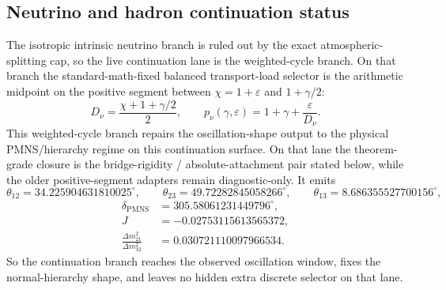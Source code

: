 \documentclass[11pt]{article}
\begin{document}
\subsection{Neutrino and hadron continuation status}

The isotropic intrinsic neutrino branch is ruled out by the exact atmospheric-splitting cap, so the live continuation lane is the weighted-cycle branch. On that branch the standard-math-fixed balanced transport-load selector is the arithmetic midpoint on the positive segment between \(\chi=1+\varepsilon\) and \(1+\gamma/2\):
\[
D_\nu=\frac{\chi+1+\gamma/2}{2},
\qquad
p_\nu(\gamma,\varepsilon)=1+\gamma+\frac{\varepsilon}{D_\nu}.
\]
This weighted-cycle branch repairs the oscillation-shape output to the physical PMNS/hierarchy regime on this continuation surface. On that lane the theorem-grade closure is the bridge-rigidity / absolute-attachment pair stated below, while the older positive-segment adapters remain diagnostic-only. It emits
\[
\theta_{12}=34.225904631810025^\circ,\qquad
\theta_{23}=49.72282845058266^\circ,\qquad
\theta_{13}=8.686355527700156^\circ,
\]
\[
\begin{aligned}
\delta_{\mathrm{PMNS}}&=305.58061231449796^\circ,\\
J&=-0.02753115613565372,\\
\frac{\Delta m_{21}^2}{\Delta m_{32}^2}&=0.030721110097966534.
\end{aligned}
\]
So the continuation branch reaches the observed oscillation window, fixes the normal-hierarchy shape, and leaves no hidden extra discrete selector on that lane.
\end{document}
